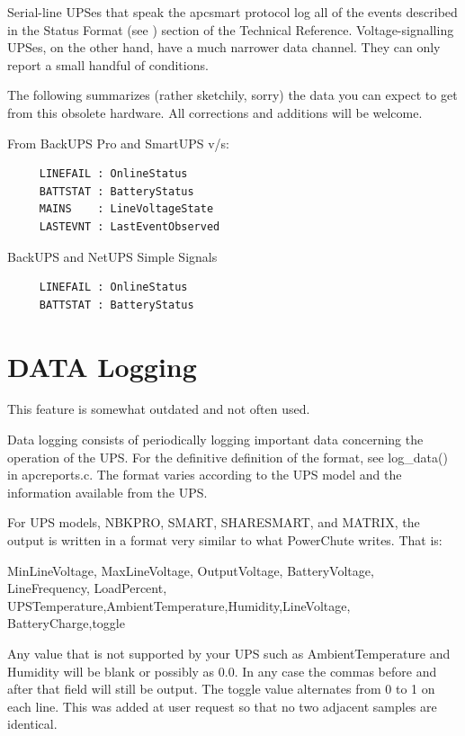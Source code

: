 {{{{{{{Serial-line UPSes that speak the apcsmart protocol log all of the events
described in the Status Format (see 
) section of
the Technical Reference.  Voltage-signalling UPSes, on the other hand, have a
much narrower data channel.  They can only report a small handful of
conditions.  

The following summarizes (rather sketchily, sorry) the data you can expect to
get from this obsolete hardware.  All corrections and additions will be
welcome.  

From BackUPS Pro and SmartUPS v/s: 

\footnotesize
\begin{verbatim}
     LINEFAIL : OnlineStatus
     BATTSTAT : BatteryStatus
     MAINS    : LineVoltageState
     LASTEVNT : LastEventObserved
\end{verbatim}
\normalsize

BackUPS and NetUPS Simple Signals 

\footnotesize
\begin{verbatim}
     LINEFAIL : OnlineStatus
     BATTSTAT : BatteryStatus
\end{verbatim}
\normalsize

\label{DATA-Logging}

\section*{DATA Logging}

\label{index-Logging_002c-DATA-233}
\label{index-DATA-Logging-234}
This feature is somewhat outdated and not often used.  

Data logging consists of periodically logging important data concerning the
operation of the UPS. For the definitive definition of the format, see
log\_data() in apcreports.c. The format varies according to the UPS model and
the information available from the UPS.  

For UPS models, NBKPRO, SMART, SHARESMART, and MATRIX, the output is written
in a format very similar to what PowerChute writes. That is:  

MinLineVoltage, MaxLineVoltage, OutputVoltage, BatteryVoltage, LineFrequency,
LoadPercent, UPSTemperature,AmbientTemperature,Humidity,LineVoltage,
BatteryCharge,toggle  

Any value that is not supported by your UPS such as AmbientTemperature and
Humidity will be blank or possibly as 0.0. In any case the commas before and
after that field will still be output. The toggle value alternates from 0 to 1
on each line. This was added at user request so that no two adjacent samples
are identical.  

}}}}}}}
